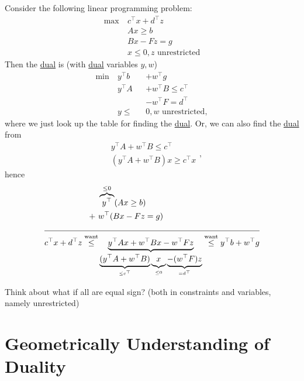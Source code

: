 \begin{eg}
	Consider the following linear programming problem:
	\begin{align*}
		\max~ & c^{\top}x+d^{\top}z            \\
		      & Ax\geq b                       \\
		      & Bx - Fz = g                    \\
		      & x\leq 0, z\text{ unrestricted}
	\end{align*}
	Then the \hyperref[def:dual]{dual} is (with \hyperref[def:dual]{dual} variables \(y, w\))
	\[
		\begin{alignedat}{3}
			\min~ & y^{\top}b   &&+w^{\top}g            \\
			& y^{\top}A  &&+w^{\top}B  \leq c^{\top} \\
			& &&-w^{\top}F = d^{\top}    \\
			& y\leq &&0, w \text{ unrestricted},
		\end{alignedat}
	\]
	where we just look up the table for finding the \hyperref[def:dual]{dual}. Or, we can also find the \hyperref[def:dual]{dual} from
	\[
		\begin{split}
			&y^{\top} A + w^{\top} B\leq c^{\top}\\
			&(y^{\top} A+w^{\top} B)x\geq c^{\top} x
		\end{split},
	\]
	hence
	\[
		\begin{split}
			&\overbrace{y^{\top}}^{\leq 0}(Ax\geq b)\\
			+\ &w^{\top}(Bx - Fz = g)\\
			\cline{1-2}
			c^{\top}x + d^{\top}z\overset{\text{want}}{\leq}&\underbrace{y^{\top}Ax + w^{\top}Bx - w^{\top} Fz}_{\underbrace{(y^{\top} A + w^{\top} B)}_{\leq c^{\top}}\underbrace{\vphantom{y^{\top}A}x}_{\leq 0} \underbrace{- (w^{\top} F)z}_{=d^{\top}}} \overset{\text{want}}{\leq} y^{\top}b+w^{\top}g
		\end{split}
	\]
\end{eg}
\begin{remark}
	Think about what if all are equal sign? (both in constraints and variables, namely unrestricted)
\end{remark}

\section{Geometrically Understanding of Duality}
